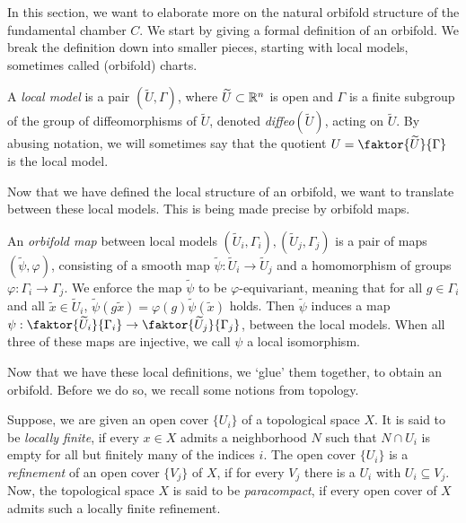 In this section, we want to elaborate more on the natural orbifold structure of the fundamental chamber \(C\).
We start by giving a formal definition of an orbifold.
We break the definition down into smaller pieces, starting with local models, sometimes called (orbifold) charts.

\begin{definition}
    A \emph{local model} is a pair \((\widetilde{U}, \Gamma)\), where \(\widetilde{U} \subset \mathbb{R}^n\) is open and \(\Gamma\) is a finite subgroup of the group of diffeomorphisms of \(\widetilde{U}\), denoted \emph{diffeo}\((\widetilde{U})\), acting on \(\widetilde{U}\).
    By abusing notation, we will sometimes say that the quotient \(U = \faktor{\widetilde{U}}{\Gamma}\;\) is the local model.
\end{definition}

Now that we have defined the local structure of an orbifold, we want to translate between these local models.
This is being made precise by orbifold maps.

\begin{definition}
    An \emph{orbifold map} between local models \((\widetilde{U}_i, \Gamma_i), (\widetilde{U}_j, \Gamma_j)\) is a pair of maps \((\widetilde{\psi}, \varphi)\),
    consisting of a smooth map \(\widetilde{\psi} : \widetilde{U}_i \to \widetilde{U}_j\) and a homomorphism of groups \(\varphi : \Gamma_i \to \Gamma_j\).
    We enforce the map \(\widetilde{\psi}\) to be \(\varphi\)-equivariant, meaning that for all \(g \in \Gamma_i\) and all \(\widetilde{x} \in \widetilde{U}_i\), \(\widetilde{\psi}(g\widetilde{x}) = \varphi(g)\widetilde{\psi}(\widetilde{x})\) holds.
    Then \(\widetilde{\psi}\) induces a map \(\psi : \faktor{\widetilde{U}_i}{\Gamma_i} \to \faktor{\widetilde{U}_j}{\Gamma_j}\), between the local models.
    When all three of these maps are injective, we call \(\psi\) a local isomorphism.
\end{definition}

Now that we have these local definitions, we `glue' them together, to obtain an orbifold.
Before we do so, we recall some notions from topology.

\noindent
Suppose, we are given an open cover \(\{U_i\}\) of a topological space \(X\).
It is said to be \emph{locally finite}, if every \(x \in X\) admits a neighborhood \(N\) such that \(N \cap U_i\) is empty for all but finitely many of the indices \(i\).
The open cover \(\{U_i\}\) is a \emph{refinement} of an open cover \(\{V_j\}\) of \(X\), if for every \(V_j\) there is a \(U_i\) with \(U_i \subseteq V_j\).
Now, the topological space \(X\) is said to be \emph{paracompact}, if every open cover of \(X\) admits such a locally finite refinement.

